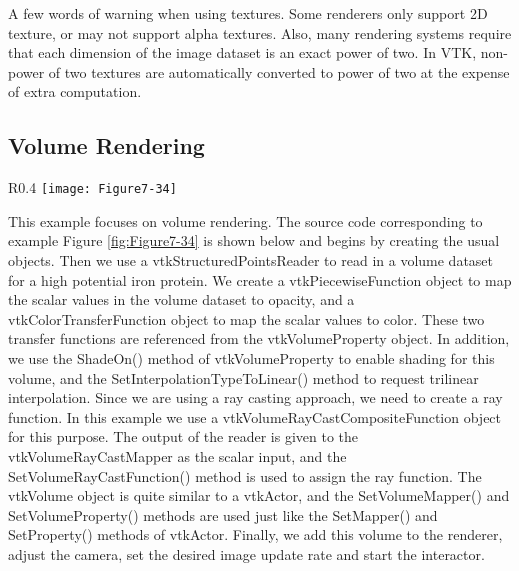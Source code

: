 A few words of warning when using textures. Some renderers only support 2D texture, or may not support alpha textures. Also, many rendering systems require that each dimension of the image dataset is an exact power of two. In VTK, non-power of two textures are automatically converted to power of two at the expense of extra computation.

\subsection{Volume Rendering}

\begin{wrapfigure}{R}{0.4\textwidth}
	\centering
	\texttt{[image: Figure7-34]}
	\caption{Volume rendering of a high potential iron protein.(\href{https://lorensen.github.io/VTKExamples/site/Cxx/VolumeRendering/SimpleRayCast/}{SimpleRayCast.cxx}) or (\href{https://lorensen.github.io/VTKExamples/site/Python/VolumeRendering/SimpleRayCast/}{SimpleRayCast.py})}
	\label{fig:Figure7-34}
\end{wrapfigure}

This example focuses on volume rendering. The source code corresponding to example Figure \ref{fig:Figure7-34} is shown below and begins by creating the usual objects. Then we use a vtkStructuredPointsReader to read in a volume dataset for a high potential iron protein. We create a vtkPiecewiseFunction object to map the scalar values in the volume dataset to opacity, and a vtkColorTransferFunction object to map the scalar values to color. These two transfer functions are referenced from the vtkVolumeProperty object. In addition, we use the ShadeOn() method of vtkVolumeProperty to enable shading for this volume, and the SetInterpolationTypeToLinear() method to request trilinear interpolation. Since we are using a ray casting approach, we need to create a ray function. In this example we use a vtkVolumeRayCastCompositeFunction object for this purpose. The output of the reader is given to the vtkVolumeRayCastMapper as the scalar input, and the SetVolumeRayCastFunction() method is used to assign the ray function. The vtkVolume object is quite similar to a vtkActor, and the SetVolumeMapper() and SetVolumeProperty() methods are used just like the SetMapper() and SetProperty() methods of vtkActor. Finally, we add this volume to the renderer, adjust the camera, set the desired image update rate and start the interactor.


